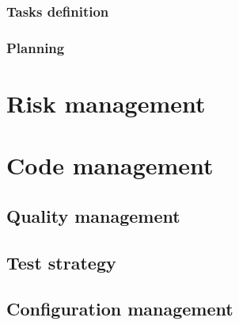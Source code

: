 \documentclass{report}
\begin{document}
\subsection{Tasks definition}

\subsection{Planning}


\chapter{Risk management}


\chapter{Code management}

\section{Quality management}

\paragraph{}
\hspace{4mm}\textnormal{}

\section{Test strategy}

\paragraph{}
\hspace{4mm}\textnormal{}

\section{Configuration management}

\paragraph{}
\hspace{4mm}\textnormal{}
\end{document}
